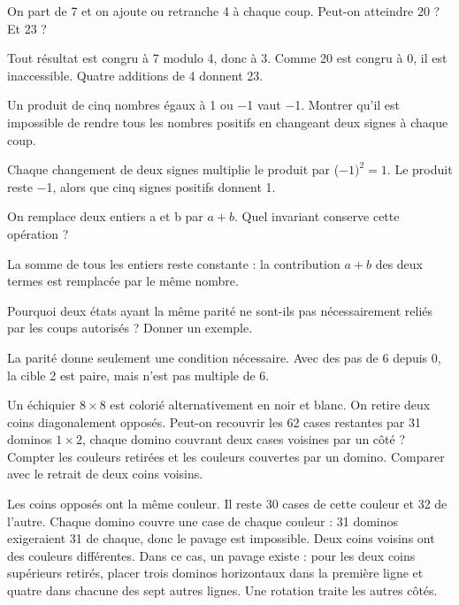 \documentclass[11pt]{article}
\begin{document}
On part de 7 et on ajoute ou retranche 4 à chaque coup. Peut-on atteindre 20 ? Et 23 ?\par
Tout résultat est congru à 7 modulo 4, donc à 3. Comme 20 est congru à 0, il est inaccessible. Quatre additions de 4 donnent 23.\par
{}
Un produit de cinq nombres égaux à 1 ou −1 vaut −1. Montrer qu’il est impossible de rendre tous les nombres positifs en changeant deux signes à chaque coup.\par
Chaque changement de deux signes multiplie le produit par (−\(1)^{2} = 1\). Le produit reste −1, alors que cinq signes positifs donnent 1.\par
{}
On remplace deux entiers a et b par \(a + b\). Quel invariant conserve cette opération ?\par
La somme de tous les entiers reste constante : la contribution \(a + b\) des deux termes est remplacée par le même nombre.\par
{}
Pourquoi deux états ayant la même parité ne sont-ils pas nécessairement reliés par les coups autorisés ? Donner un exemple.\par
La parité donne seulement une condition nécessaire. Avec des pas de 6 depuis 0, la cible 2 est paire, mais n’est pas multiple de 6.\par
{}
Un échiquier \(8 \times  8\) est colorié alternativement en noir et blanc. On retire deux coins diagonalement opposés. Peut-on recouvrir les 62 cases restantes par 31 dominos \(1 \times  2\), chaque domino couvrant deux cases voisines par un côté ? Compter les couleurs retirées et les couleurs couvertes par un domino. Comparer avec le retrait de deux coins voisins.\par
Les coins opposés ont la même couleur. Il reste 30 cases de cette couleur et 32 de l’autre. Chaque domino couvre une case de chaque couleur : 31 dominos exigeraient 31 de chaque, donc le pavage est impossible. Deux coins voisins ont des couleurs différentes. Dans ce cas, un pavage existe : pour les deux coins supérieurs retirés, placer trois dominos horizontaux dans la première ligne et quatre dans chacune des sept autres lignes. Une rotation traite les autres côtés.\par
\end{document}
